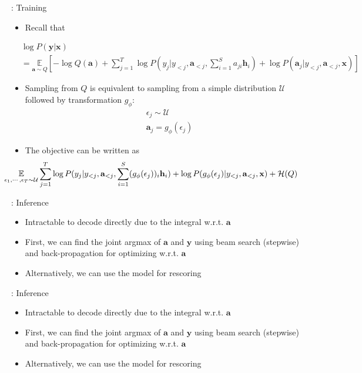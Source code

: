 \begin{frame}{\subsecname: Training}
\begin{itemize}
        \item Recall that 
\end{itemize}
 {\small
   \begin{align*}
 &\log P(\mathbf{y}|\mathbf{x}) \\
 &= \underset{\mathbf{a}\sim Q}{\mathbb{E}} [- \log Q(\mathbf{a})+\sum_{j=1}^T \log P(y_j | y_{<j}, \mathbf{a}_{<j},\sum_{i=1}^S a_{ji} \mathbf{h}_i)+ \log P(\mathbf{a}_j | y_{<j}, \mathbf{a}_{<j},\mathbf{x})]
\end{align*}}
    \begin{itemize}
        \item<2-> Sampling from $Q$ is equivalent to sampling from a simple distribution $\mathcal{U}$ followed by transformation $g_{\phi}$:
        \begin{align*}
            &\epsilon_j\sim \mathcal{U}\\
            &\mathbf{a}_j = g_\phi(\epsilon_j)
        \end{align*}
        \item<3-> The objective can be written as
        {\small
        \begin{equation*}
    \hspace{-1.3cm}\underset{\epsilon_1,\cdots,\epsilon_T\sim \mathcal{U}}{\mathbb{E}} \sum_{j=1}^T \log P(y_j | y_{<j}, \mathbf{a}_{<j},\sum_{i=1}^S (g_\phi (\epsilon_j))_{i} \mathbf{h}_i)+ \log P(g_\phi (\epsilon_j) | y_{<j}, \mathbf{a}_{<j},\mathbf{x}) + \mathcal{H}(Q)
\end{equation*}}
    \end{itemize}

\end{frame}

\begin{frame}{\subsecname: Inference}
\begin{itemize}
    \item Intractable to decode directly due to the integral w.r.t. $\mathbf{a}$
    \item First, we can find the joint argmax of $\mathbf{a}$ and $\mathbf{y}$ using beam search (stepwise) and back-propagation for optimizing w.r.t. $\mathbf{a}$
    \item Alternatively, we can use the model for rescoring
\end{itemize}
\end{frame}

\begin{frame}{\subsecname: Inference}
\begin{itemize}
    \item Intractable to decode directly due to the integral w.r.t. $\mathbf{a}$
    \item First, we can find the joint argmax of $\mathbf{a}$ and $\mathbf{y}$ using beam search (stepwise) and back-propagation for optimizing w.r.t. $\mathbf{a}$
    \item Alternatively, we can use the model for rescoring
\end{itemize}
\end{frame}

